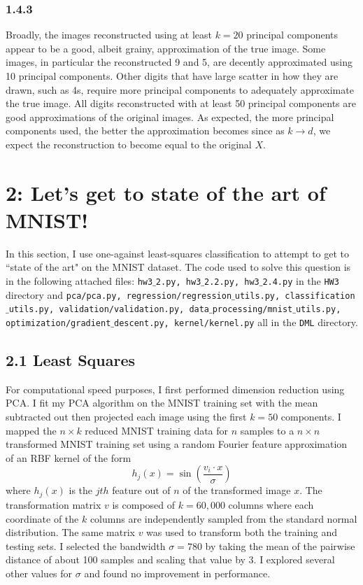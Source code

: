 \documentclass[12pt]{amsart}
\begin{document}
\subsubsection*{1.4.3}
Broadly, the images reconstructed using at least $k = 20$ principal components appear to be a good, albeit grainy, approximation of the true image.  Some images, in particular the reconstructed 9 and 5, are decently approximated using 10 principal components.  Other digits that have large scatter in how they are drawn, such as 4s, require more principal components to adequately approximate the true image.  All digits reconstructed with at least 50 principal components are good approximations of the original images.  As expected, the more principal components used, the better the approximation becomes since as $k \rightarrow d$, we expect the reconstruction to become equal to the original $X$.

\section*{2: Let's get to state of the art of MNIST!}

In this section, I use one-against least-squares classification to attempt to get to ``state of the art" on the MNIST dataset.  The code used to solve this question is in the following attached files: {\tt hw3$\_$2.py, hw3$\_$2.2.py, hw3$\_$2.4.py} in the {\tt HW3} directory and {\tt pca/pca.py, regression/regression$\_$utils.py, classification$\_$utils.py, validation/validation.py, data$\_$processing/mnist$\_$utils.py, optimization/gradient$\_$descent.py, kernel/kernel.py} all in the {\tt DML} directory.

\subsection*{2.1 Least Squares}

For computational speed purposes, I first performed dimension reduction using PCA.  I fit my PCA algorithm on the MNIST training set with the mean subtracted out then projected each image using the first $k = 50$ components.  I mapped the $n \times k$ reduced MNIST training data for $n$ samples to a $n \times n$ transformed MNIST training set using a random Fourier feature approximation of an RBF kernel of the form
\begin{equation} \label{eqn:rbf_kernel}
h_j(x) = \sin \left( \frac{v_i \cdot x}{\sigma} \right)
\end{equation}
where $h_j(x)$ is the $jth$ feature out of $n$ of the transformed image $x$.  The transformation matrix $v$ is composed of $k = 60,000$ columns where each coordinate of the $k$ columns are independently sampled from the standard normal distribution.  The same matrix $v$ was used to transform both the training and testing sets.  I selected the bandwidth $\sigma = 780$ by taking the mean of the pairwise distance of about 100 samples and scaling that value by 3.  I explored several other values for $\sigma$ and found no improvement in performance.  
\end{document}
